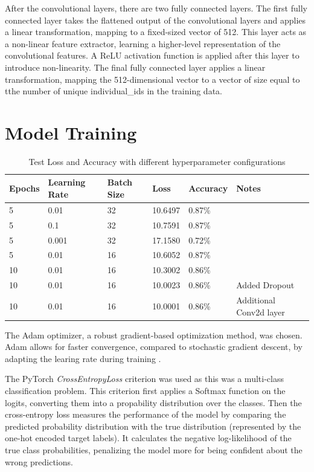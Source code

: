 \documentclass{article}
\begin{document}
After the convolutional layers, there are two fully connected layers. The first fully connected layer takes the flattened output of the convolutional layers and applies a linear transformation, mapping to a fixed-sized vector of 512. This layer acts as a non-linear feature extractor, learning a higher-level representation of the convolutional features. A ReLU activation function is applied after this layer to introduce non-linearity.
The final fully connected layer applies a linear transformation, mapping the 512-dimensional vector to a vector of size equal to tthe number of unique individual\_ids in the training data.


\section{Model Training}

\begin{table}[ht]
\centering
\begin{tabularx}{\textwidth}{|X|X|X|X|X|X|}
\hline
\textbf{Epochs} & \textbf{Learning Rate} & \textbf{Batch Size} & \textbf{Loss} & \textbf{Accuracy} & \textbf{Notes} \\
\hline
5 & 0.01 & 32 & 10.6497 & 0.87\% & \\
\hline
5 & 0.1 & 32 & 10.7591 & 0.87\% &  \\
\hline
5 & 0.001 & 32 & 17.1580 & 0.72\% & \\
\hline
5 & 0.01 & 16 & 10.6052 & 0.87\% & \\
\hline
10 & 0.01 & 16 & 10.3002 & 0.86\% & \\
\hline
10 & 0.01 & 16 & 10.0023 & 0.86\% & Added Dropout \\
\hline
10 & 0.01 & 16 & 10.0001 & 0.86\% & Additional Conv2d layer \\
\hline
\end{tabularx}
\caption{Test Loss and Accuracy with different hyperparameter configurations}
\label{tab:example}
\end{table}

The Adam optimizer, a robust gradient-based optimization method, was chosen. Adam allows for faster convergence, compared to stochastic gradient descent, by adapting the learing rate during training \cite{kingma2017adam}.

The PyTorch \emph{CrossEntropyLoss} criterion \cite{cross_entropy_loss} was used as this was a multi-class classification problem. This criterion first applies a Softmax function on the logits, converting them into a propability distribution over the classes. Then the cross-entropy loss measures the performance of the model by comparing the predicted probability distribution with the true distribution (represented by the one-hot encoded target labels). It calculates the negative log-likelihood of the true class probabilities, penalizing the model more for being confident about the wrong predictions.
\end{document}
